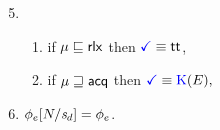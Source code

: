\begin{minipage}{1.0\linewidth}
\begin{minipage}[t]{.55\textwidth}
\begin{enumerate}[topsep=0pt,label=(\textsc{r}\arabic*),ref=\textsc{r}\arabic*]
    \setcounter{enumi}{4}
    \item[] 
      \begin{enumerate}[leftmargin=0pt]
      \item \label{read-term-nonempty-ca-addr}
        if $\mu\sqsubseteq{\mathsf{rlx}}$ then $\aTerm \riff \TRUE$,
      \item \label{read-term-empty-ca-addr}
        if $\mu\sqsupseteq{\mathsf{acq}}$ then
        \begin{math}
          \aTerm \riff
          \kappaE{}, %
        \end{math}
      \end{enumerate}      
    \item \label{read-phi-ca-addr}
      $\phi_e[N/\mathit{s}_{d}]=\phi_e$.
    \end{enumerate}
  \end{minipage}
\end{minipage}
